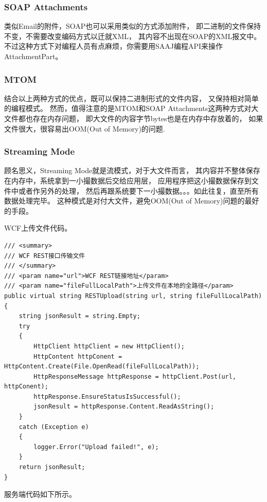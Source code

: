 \documentclass{book}
\begin{document}
\subsubsection{SOAP Attachments}

类似Email的附件，SOAP也可以采用类似的方式添加附件，
即二进制的文件保持不变，不需要改变编码方式以迁就XML，
其内容不出现在SOAP的XML报文中。
不过这种方式下对编程人员有点麻烦，你需要用SAAJ编程API来操作AttachmentPart。

\subsubsection{MTOM}

结合以上两种方式的优点，既可以保持二进制形式的文件内容，
又保持相对简单的编程模式。
 然而，值得注意的是MTOM和SOAP Attachments这两种方式对大文件都也存在内存问题，
 即大文件的内容字节bytes也是在内存中存放着的，
 如果文件很大，很容易出OOM(Out of Memory)的问题.

\subsubsection{Streaming Mode}

顾名思义，Streaming Mode就是流模式，对于大文件而言，
其内容并不整体保存在内存中，系统拿到一小撮数据后交给应用层，
应用程序把这小撮数据保存到文件中或者作另外的处理，
然后再跟系统要下一小撮数据。。。如此往复，直至所有数据处理完毕。
这种模式是对付大文件，避免OOM(Out of Memory)问题的最好的手段。

WCF上传文件代码。

\begin{lstlisting}[language={[Sharp]C}]
/// <summary>
/// WCF REST接口传输文件
/// </summary>
/// <param name="url">WCF REST链接地址</param>
/// <param name="fileFullLocalPath">上传文件在本地的全路径</param>
public virtual string RESTUpload(string url, string fileFullLocalPath)
{
    string jsonResult = string.Empty;
    try
    {
        HttpClient httpClient = new HttpClient();
        HttpContent httpConent = HttpContent.Create(File.OpenRead(fileFullLocalPath));
        HttpResponseMessage httpResponse = httpClient.Post(url, httpConent);
        httpResponse.EnsureStatusIsSuccessful();
        jsonResult = httpResponse.Content.ReadAsString();
    }
    catch (Exception e)
    {
        logger.Error("Upload failed!", e);
    }
    return jsonResult;
}
\end{lstlisting}

服务端代码如下所示。
\end{document}
